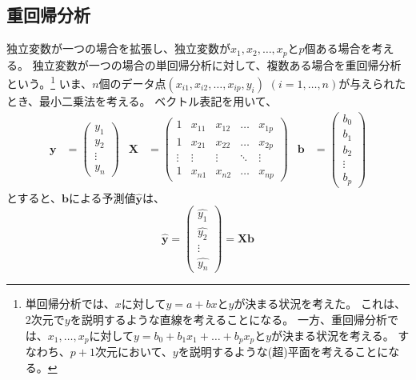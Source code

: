 \subsection{重回帰分析}
独立変数が一つの場合を拡張し、独立変数が$x_1, x_2, \dots, x_p$と$p$個ある場合を考える。
独立変数が一つの場合の単回帰分析に対して、複数ある場合を重回帰分析という。\footnote{
	単回帰分析では、$x$に対して$y=a+bx$と$y$が決まる状況を考えた。
	これは、2次元で$y$を説明するような直線を考えることになる。
	一方、重回帰分析では、$x_1, \dots, x_p$に対して$y=b_0 + b_1x_1 + \dots + b_px_p$と$y$が決まる状況を考える。
	すなわち、$p+1$次元において、$y$を説明するような(超)平面を考えることになる。
}
いま、$n$個のデータ点$(x_{i1}, x_{i2}, \dots, x_{ip}, y_i)$ $(i=1,\dots,n)$が与えられたとき、最小二乗法を考える。
ベクトル表記を用いて、
\begin{align}
	\bm{y} & = \begin{pmatrix}
		           y_1    \\
		           y_2    \\
		           \vdots \\
		           y_n
	           \end{pmatrix}                             &
	\bm{X} & = \begin{pmatrix}
		           1      & x_{11} & x_{12} & \dots  & x_{1p} \\
		           1      & x_{21} & x_{22} & \dots  & x_{2p} \\
		           \vdots & \vdots & \vdots & \ddots & \vdots \\
		           1      & x_{n1} & x_{n2} & \dots  & x_{np}
	           \end{pmatrix} &
	\bm{b} & = \begin{pmatrix}
		           b_0    \\
		           b_1    \\
		           b_2    \\
		           \vdots \\
		           b_p
	           \end{pmatrix}
\end{align}
とすると、$\bm{b}$による予測値$\bm{\hat{y}}$は、
\begin{equation}\label{eq:regression-multiple}
	\bm{\hat{y}} = \begin{pmatrix}\hat{y_1}\\ \hat{y_2} \\ \vdots \\ \hat{y_n}\end{pmatrix} = \bm{Xb}
\end{equation}

